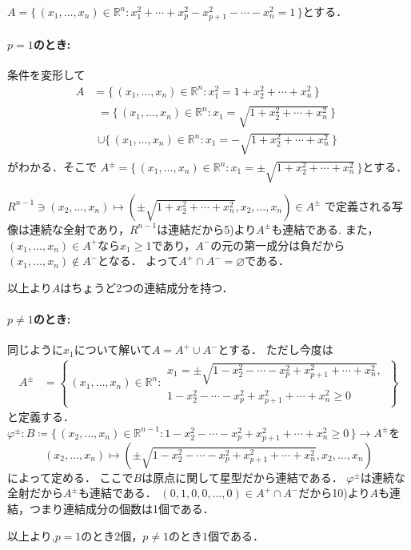 \begin{leftbar}
    $A = \{\,(x_1,\ldots,x_n) \in \mathbb{R}^n: x_1^2+\cdots+x_p^2-x_{p+1}^2-\cdots-x_n^2 = 1\,\}$とする．

    \paragraph{$p=1$のとき:}
    条件を変形して
    \begin{align*}
        A
         & = \{\,(x_1,\ldots,x_n) \in \mathbb{R}^n: x_1^2 = 1+x_2^2+\cdots+x_n^2\,\} \\
         &
        \begin{multlined}
            = \{\,(x_1,\ldots,x_n) \in  \mathbb{R}^n: x_1 = \textstyle\sqrt{1+x_2^2+\cdots+x_n^2}\,\} \\
            \cup \{\,(x_1,\ldots,x_n) \in  \mathbb{R}^n: x_1 = -\textstyle\sqrt{1+x_2^2+\cdots+x_n^2}\,\}
        \end{multlined}
    \end{align*}
    がわかる．そこで
    $A^{\pm} = \{\,(x_1,\ldots,x_n) \in  \mathbb{R}^n: x_1 = \pm\textstyle\sqrt{1+x_2^2+\cdots+x_n^2}\,\}$とする．

    $R^{n-1} \ni (x_2,\ldots,x_n) \longmapsto (\pm\textstyle\sqrt{1+x_2^2+\cdots+x_n^2},x_2,\ldots,x_n) \in A^{\pm}$
    で定義される写像は連続な全射であり，$R^{n-1}$は連結だから5)より$A^{\pm}$も連結である.
    また，$(x_1,\ldots,x_n) \in A^+$なら$x_1 \ge 1$であり，$A^-$の元の第一成分は負だから$(x_1,\ldots,x_n) \notin A^-$となる．
    よって$A^+ \cap A^- = \varnothing$である．

    以上より$A$はちょうど2つの連結成分を持つ．

    \paragraph{$p\neq1$のとき:}
    同じように$x_1$について解いて$A = A^+ \cup A^-$とする．
    ただし今度は
    \begin{align*}
        A^{\pm}
         & = \left\{\,(x_1,\ldots,x_n) \in \mathbb{R}^n:
        \begin{aligned}
            x_1 = \pm\textstyle\sqrt{1-x_2^2-\cdots-x_p^2+x_{p+1}^2+\cdots+x_n^2}, \\
            1-x_2^2-\cdots-x_p^2+x_{p+1}^2+\cdots+x_n^2 \ge 0
        \end{aligned}
        \,\right\}
    \end{align*}
    と定義する．
    $\varphi^{\pm} \colon B \coloneq \{\,(x_2,\ldots,x_n) \in \mathbb{R}^{n-1}: 1-x_2^2-\cdots-x_p^2+x_{p+1}^2+\cdots+x_n^2 \ge 0\,\} \to A^{\pm}$を
    \[
        (x_2,\ldots,x_n) \longmapsto (\pm\textstyle\sqrt{1-x_2^2-\cdots-x_p^2+x_{p+1}^2+\cdots+x_n^2},x_2,\ldots,x_n)
    \]
    によって定める．
    ここで$B$は原点に関して星型だから連結である．
    $\varphi^{\pm}$は連続な全射だから$A^{\pm}$も連結である．
    $(0,1,0,0,\ldots,0) \in A^+ \cap A^-$だから10)より$A$も連結，つまり連結成分の個数は1個である．

    以上より,$p=1$のとき$2$個，$p \ne 1$のとき$1$個である．
\end{leftbar}



